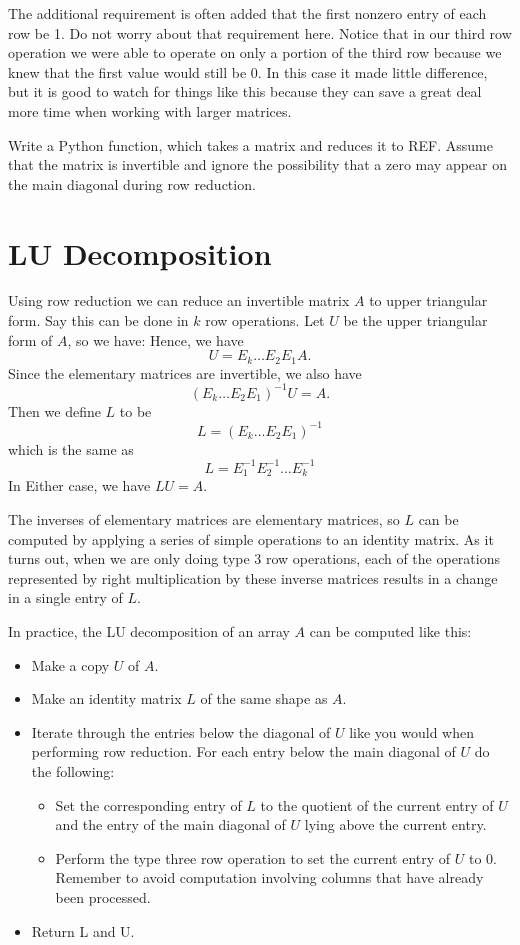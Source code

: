 The additional requirement is often added that the first nonzero entry of each row be 1.
Do not worry about that requirement here.
Notice that in our third row operation we were able to operate on only a portion of the third row because we knew that the first value would still be 0.
In this case it made little difference, but it is good to watch for things like this because they can save a great deal more time when working with larger matrices.

\begin{problem}
\label{prob:REF}
Write a Python function, which takes a matrix and reduces it to REF.
Assume that the matrix is invertible and ignore the possibility that a zero may appear on the main diagonal during row reduction.
\end{problem}

\section*{LU Decomposition}

Using row reduction we can reduce an invertible matrix $A$ to upper triangular form.
Say this can be done in $k$ row operations.
Let $U$ be the upper triangular form of $A$, so we have:
Hence, we have
\[
U = E_k \dots E_2 E_1 A.
\]
Since the elementary matrices are invertible, we also have
\[
(E_k \dots E_2 E_1)^{-1} U =  A.
\]
Then we define $L$ to be
\[
L = (E_k \dots E_2 E_1)^{-1}
\]
which is the same as
\[
L = E_1^{-1} E_2^{-1} \dots E_k^{-1}
\]
In Either case, we have $L U = A$.

The inverses of elementary matrices are elementary matrices, so $L$ can be computed by applying a series of simple operations to an identity matrix.
As it turns out, when we are only doing type 3 row operations, each of the operations represented by right multiplication by these inverse matrices results in a change in a single entry of $L$.

In practice, the LU decomposition of an array $A$ can be computed like this:
\begin{itemize}
\item Make a copy $U$ of $A$.
\item Make an identity matrix $L$ of the same shape as $A$.
\item Iterate through the entries below the diagonal of $U$ like you would when performing row reduction.
For each entry below the main diagonal of $U$ do the following:
	\begin{itemize}
	\item Set the corresponding entry of $L$ to the quotient of the current entry of $U$ and the entry of the main diagonal of $U$ lying above the current entry.
	\item Perform the type three row operation to set the current entry of $U$ to 0.
		Remember to avoid computation involving columns that have already been processed.
	\end{itemize}
\item Return L and U.
\end{itemize}

